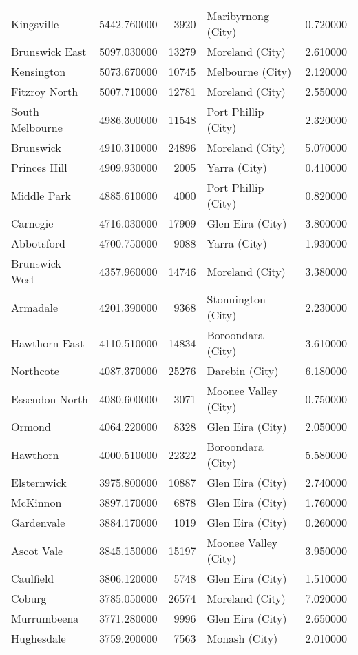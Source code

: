 \begin{longtable}{lrrlr}
Kingsville & 5442.760000 & 3920 & Maribyrnong (City) & 0.720000 \\
Brunswick East & 5097.030000 & 13279 & Moreland (City) & 2.610000 \\
Kensington & 5073.670000 & 10745 & Melbourne (City) & 2.120000 \\
Fitzroy North & 5007.710000 & 12781 & Moreland (City) & 2.550000 \\
South Melbourne & 4986.300000 & 11548 & Port Phillip (City) & 2.320000 \\
Brunswick & 4910.310000 & 24896 & Moreland (City) & 5.070000 \\
Princes Hill & 4909.930000 & 2005 & Yarra (City) & 0.410000 \\
Middle Park & 4885.610000 & 4000 & Port Phillip (City) & 0.820000 \\
Carnegie & 4716.030000 & 17909 & Glen Eira (City) & 3.800000 \\
Abbotsford & 4700.750000 & 9088 & Yarra (City) & 1.930000 \\
Brunswick West & 4357.960000 & 14746 & Moreland (City) & 3.380000 \\
Armadale & 4201.390000 & 9368 & Stonnington (City) & 2.230000 \\
Hawthorn East & 4110.510000 & 14834 & Boroondara (City) & 3.610000 \\
Northcote & 4087.370000 & 25276 & Darebin (City) & 6.180000 \\
Essendon North & 4080.600000 & 3071 & Moonee Valley (City) & 0.750000 \\
Ormond & 4064.220000 & 8328 & Glen Eira (City) & 2.050000 \\
Hawthorn & 4000.510000 & 22322 & Boroondara (City) & 5.580000 \\
Elsternwick & 3975.800000 & 10887 & Glen Eira (City) & 2.740000 \\
McKinnon & 3897.170000 & 6878 & Glen Eira (City) & 1.760000 \\
Gardenvale & 3884.170000 & 1019 & Glen Eira (City) & 0.260000 \\
Ascot Vale & 3845.150000 & 15197 & Moonee Valley (City) & 3.950000 \\
Caulfield & 3806.120000 & 5748 & Glen Eira (City) & 1.510000 \\
Coburg & 3785.050000 & 26574 & Moreland (City) & 7.020000 \\
Murrumbeena & 3771.280000 & 9996 & Glen Eira (City) & 2.650000 \\
Hughesdale & 3759.200000 & 7563 & Monash (City) & 2.010000 \\

\end{longtable}
